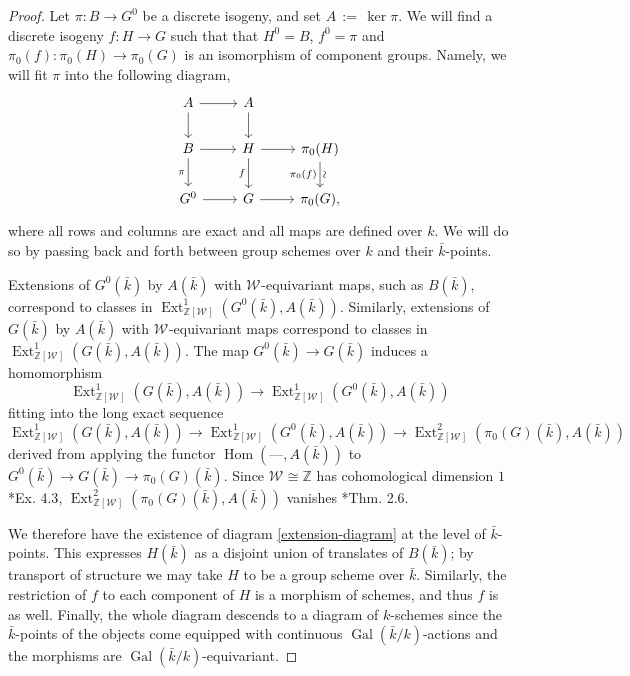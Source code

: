 \documentclass[10pt]{amsart}
\theoremstyle{plain}
\theoremstyle{definition}
\theoremstyle{remark}
\newcommand{\ZZ}{{\mathbb{Z}}}
\newcommand{\bFq}{\bar{k}}
\newcommand{\Fq}{k}
\newcommand{\Weil}[1]{\mathcal{W}_{#1}}
\DeclareMathOperator{\Gal}{Gal}
\DeclareMathOperator{\Hom}{Hom}
\DeclareMathOperator{\Ext}{Ext}
\newcommand{\ceq}{{\, :=\, }}
\begin{document}
\begin{proof}
Let $\pi: B \to G^0$ be a discrete isogeny, and set $A \ceq \ker \pi$.
  We will find a discrete isogeny $f: H\to G$
  such that that $H^0 = B$, $f^0 =\pi$ and
  $\pi_0(f) : \pi_0(H)\to \pi_0(G)$ is an isomorphism of component
  groups.  Namely, we will fit $\pi$ into the following diagram,
  \begin{equation}\label{extension-diagram}
  \begin{tikzcd}
  A \arrow{r} \dar & A \dar \\
  B \rar \dar[swap]{\pi} & H \rar \dar[swap]{f} & \pi_0(H) \arrow{d}[below,rotate=90]{\sim}[swap]{\pi_0(f)} \\
  G^0 \rar & G \rar & \pi_0(G),
  \end{tikzcd}
  \end{equation}
  where all rows and columns are exact and all maps are defined over
  $\Fq$.  We will do so by passing back and forth between group
  schemes over $\Fq$ and their $\bFq$-points.

  Extensions of $G^0(\bFq)$ by $A(\bFq)$ with $\Weil{}$-equivariant maps, such as $B(\bFq)$,
  correspond to classes in $\Ext^1_{\ZZ[\Weil{}]}(G^0(\bFq), A(\bFq))$.
  Similarly, extensions of $G(\bFq)$ by $A(\bFq)$ with $\Weil{}$-equivariant maps correspond to
  classes in $\Ext^1_{\ZZ[\Weil{}]}(G(\bFq), A(\bFq))$.  The map
  $G^0(\bFq) \to G(\bFq)$ induces a homomorphism
  \[
  \Ext^1_{\ZZ[\Weil{}]}(G(\bFq), A(\bFq)) \to \Ext^1_{\ZZ[\Weil{}]}(G^0(\bFq), A(\bFq))
  \]
  fitting into the long exact sequence 
  \[
  \Ext^1_{\ZZ[\Weil{}]}(G(\bFq), A(\bFq)) \to \Ext^1_{\ZZ[\Weil{}]}(G^0(\bFq), A(\bFq)) \to \Ext^2_{\ZZ[\Weil{}]}(\pi_0(G)(\bFq), A(\bFq))
  \]
  derived from applying
  the functor $\Hom(\mbox{---}, A(\bFq))$ to $G^0(\bFq) \to G(\bFq) \to \pi_0(G)(\bFq)$.
  Since $\Weil{} \cong \ZZ$ has cohomological dimension $1$ \cite{brown:CohomologyGrps}*{Ex. 4.3},
  $\Ext^2_{\ZZ[\Weil{}]}(\pi_0(G)(\bFq), A(\bFq))$ vanishes \cite{cartan-eilenberg:HomologicalAlgebra}*{Thm. 2.6}.

  We therefore have the existence of diagram \eqref{extension-diagram}
  at the level of $\bFq$-points.  This expresses $H(\bFq)$ as a
  disjoint union of translates of $B(\bFq)$; by transport of structure
  we may take $H$ to be a group scheme over $\bFq$.  Similarly, the
  restriction of $f$ to each component of $H$ is a morphism of
  schemes, and thus $f$ is as well.  Finally, the whole diagram
  descends to a diagram of $\Fq$-schemes since the $\bFq$-points of
  the objects come equipped with continuous $\Gal(\bFq/\Fq)$-actions and the
  morphisms are $\Gal(\bFq/\Fq)$-equivariant.
\end{proof}
\end{document}
